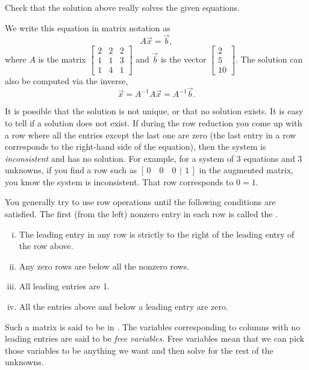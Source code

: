 \begin{exercise}
Check that the solution above really solves the given equations.
\end{exercise}

We write this equation in matrix notation as
\begin{equation*}
A \vec{x} = \vec{b} ,
\end{equation*}
where $A$ is the matrix
$\left[ \begin{smallmatrix}
2 & 2 & 2 \\
1 & 1 & 3 \\
1 & 4 & 1 
\end{smallmatrix} \right]$ and $\vec{b}$ is the vector
$\left[ \begin{smallmatrix}
2 \\
5 \\
10
\end{smallmatrix} \right]$.  The solution can also be computed via the
inverse,
\begin{equation*}
\vec{x} = A^{-1} A \vec{x} = A^{-1} \vec{b} .
\end{equation*}

\medskip

It is
possible that the solution is not unique, or that no solution exists.
It is easy to tell if a solution does not exist.  If during the row
reduction you come up with a row where all the entries except the last one
are zero (the last entry in a row corresponds to the right-hand side of the
equation), then the system is \emph{inconsistent} and
has no solution.  For
example, for a system of 3 equations and 3 unknowns, if you find a row
such as $[\,0 \quad 0 \quad 0 ~\,|\,~ 1\,]$ in the augmented matrix,
you know the system is inconsistent.  That row corresponds to $0=1$.

\medskip

You generally try to use row operations until the following conditions
are satisfied.  The first (from the left) nonzero entry in each row is called the
\emph{}.
\begin{enumerate}[(i)]
\item The leading entry in any row is strictly to the right of
the leading entry of the row above.
\item Any zero rows are below all the nonzero rows.
\item All leading entries are 1.
\item All the entries above and below a leading entry are zero.
\end{enumerate}
Such a matrix is said to be in
\emph{}.  The variables
corresponding to columns with no leading entries are said to be
\emph{free variables}.
Free variables mean that we can pick those variables
to be anything we want and then solve for the rest of the unknowns.

